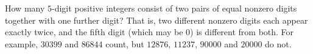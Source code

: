 How many $5$-digit positive integers consist of two pairs of equal nonzero digits together with one further digit? That is, two different nonzero digits each appear exactly twice, and the fifth digit (which may be $0$) is different from both. For example, $30399$ and $86844$ count, but $12876$, $11237$, $90000$ and $20000$ do not.
